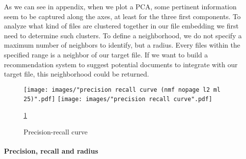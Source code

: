 \documentclass[a4paper]{article}
\begin{document}
	As we can see in appendix, when we plot a \ac{PCA}, some pertinent information seem to be captured along the axes, at least for the three first components. To analyze what kind of files are clustered together in our file embedding we first need to determine such clusters. To define a neighborhood, we do not specify a maximum number of neighbors to identify, but a radius. Every files within the specified range is a neighbor of our target file. If we want to build a recommendation system to suggest potential documents to integrate with our target file, this neighborhood could be returned.
	
	\begin{figure}[]
		\texttt{[image: images/"precision recall curve (nmf nopage l2 ml 25)".pdf]}
		\label{fig:prc-gridsearch}
		\endminipage\hfill
		\texttt{[image: images/"precision recall curve".pdf]}
		\label{fig:prc-best}
		\endminipage
		\caption{Precision-recall curve}
		\label{fig:prc}
		\ref{fig:prc}
	\end{figure}
	
	\paragraph{Precision, recall and radius}
	
\end{document}
